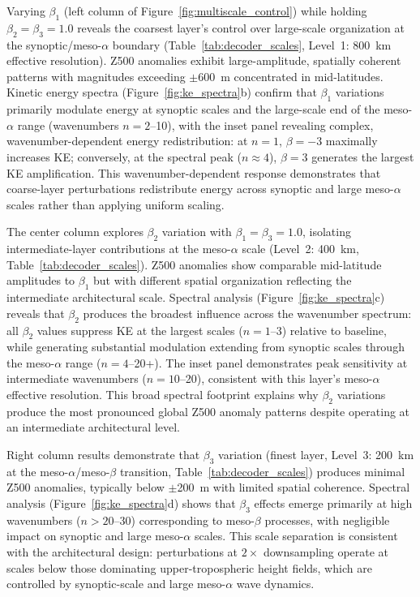 \documentclass[11pt]{article}
\begin{document}
Varying $\beta_1$ (left column of Figure~\ref{fig:multiscale_control}) while holding $\beta_2 = \beta_3 = 1.0$ reveals the coarsest layer's control over large-scale organization at the synoptic/meso-$\alpha$ boundary (Table~\ref{tab:decoder_scales}, Level~1: 800~km effective resolution). Z500 anomalies exhibit large-amplitude, spatially coherent patterns with magnitudes exceeding $\pm$600~m concentrated in mid-latitudes. Kinetic energy spectra (Figure~\ref{fig:ke_spectra}b) confirm that $\beta_1$ variations primarily modulate energy at synoptic scales and the large-scale end of the meso-$\alpha$ range (wavenumbers $n=2$--10), with the inset panel revealing complex, wavenumber-dependent energy redistribution: at $n=1$, $\beta=-3$ maximally increases KE; conversely, at the spectral peak ($n \approx 4$), $\beta=3$ generates the largest KE amplification. This wavenumber-dependent response demonstrates that coarse-layer perturbations redistribute energy across synoptic and large meso-$\alpha$ scales rather than applying uniform scaling.

The center column explores $\beta_2$ variation with $\beta_1 = \beta_3 = 1.0$, isolating intermediate-layer contributions at the meso-$\alpha$ scale (Level~2: 400~km, Table~\ref{tab:decoder_scales}). Z500 anomalies show comparable mid-latitude amplitudes to $\beta_1$ but with different spatial organization reflecting the intermediate architectural scale. Spectral analysis (Figure~\ref{fig:ke_spectra}c) reveals that $\beta_2$ produces the broadest influence across the wavenumber spectrum: all $\beta_2$ values suppress KE at the largest scales ($n=1$--3) relative to baseline, while generating substantial modulation extending from synoptic scales through the meso-$\alpha$ range ($n=4$--20+). The inset panel demonstrates peak sensitivity at intermediate wavenumbers ($n=10$--20), consistent with this layer's meso-$\alpha$ effective resolution. This broad spectral footprint explains why $\beta_2$ variations produce the most pronounced global Z500 anomaly patterns despite operating at an intermediate architectural level.

Right column results demonstrate that $\beta_3$ variation (finest layer, Level~3: 200~km at the meso-$\alpha$/meso-$\beta$ transition, Table~\ref{tab:decoder_scales}) produces minimal Z500 anomalies, typically below $\pm$200~m with limited spatial coherence. Spectral analysis (Figure~\ref{fig:ke_spectra}d) shows that $\beta_3$ effects emerge primarily at high wavenumbers ($n>20$--30) corresponding to meso-$\beta$ processes, with negligible impact on synoptic and large meso-$\alpha$ scales. This scale separation is consistent with the architectural design: perturbations at $2\times$ downsampling operate at scales below those dominating upper-tropospheric height fields, which are controlled by synoptic-scale and large meso-$\alpha$ wave dynamics.
\end{document}
